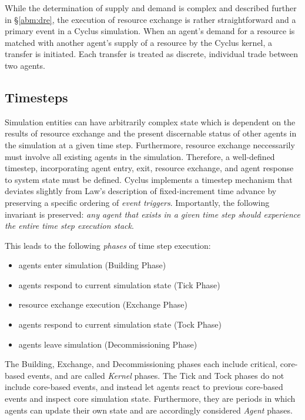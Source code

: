 While the determination of supply and demand is complex and described further in
\S \ref{abm:dre}, the execution of resource exchange is rather straightforward
and a primary event in a Cyclus simulation. When an agent's demand for a
resource is matched with another agent's supply of a resource by the Cyclus
kernel, a transfer is initiated. Each transfer is treated as discrete,
individual trade between two agents.

\subsection{Timesteps}

Simulation entities can have arbitrarily complex state which is dependent on the
results of resource exchange and the present discernable status of other agents
in the simulation at a given time step. Furthermore, resource exchange
neccessarily must involve all existing agents in the simulation. Therefore, a
well-defined timestep, incorporating agent entry, exit, resource exchange, and
agent response to system state must be defined. Cyclus implements a timestep
mechanism that deviates slightly from Law's description of fixed-increment time
advance by preserving a specific ordering of \textit{event
  triggers}. Importantly, the following invariant is preserved: \textit{any
  agent that exists in a given time step should experience the entire time step
  execution stack}.

This leads to the following \textit{phases} of time step execution:

\begin{itemize}
\item agents enter simulation (Building Phase)
\item agents respond to current simulation state (Tick Phase)
\item resource exchange execution (Exchange Phase)
\item agents respond to current simulation state (Tock Phase)
\item agents leave simulation (Decommissioning Phase)
\end{itemize}

The Building, Exchange, and Decommissioning phases each include critical,
core-based events, and are called \textit{Kernel} phases. The Tick and Tock
phases do not include core-based events, and instead let agents react to
previous core-based events and inspect core simulation state. Furthermore, they
are periods in which agents can update their own state and are accordingly
considered \textit{Agent} phases. 

